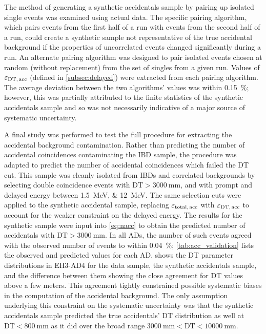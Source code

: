 The method of generating a synthetic accidentals sample
by pairing up isolated single events was examined using actual data.
The specific pairing algorithm, which pairs events from the first half of a run
with events from the second half of a run,
could create a synthetic sample not representative of the true accidental background
if the properties of uncorrelated events changed significantly during a run.
An alternate pairing algorithm was designed to pair isolated events
chosen at random (without replacement) from the set of singles from a given run.
Values of $\varepsilon_{\text{DT,\,acc}}$ (defined in \cref{subsec:delayed}) were extracted from each pairing algorithm.
The average deviation between the two algorithms' values was within \SI{0.15}{\percent};
however, this was partially attributed to the finite statistics
of the synthetic accidentals sample
and so was not necessarily indicative of a major source of systematic uncertainty.

A final study was performed to test the full procedure
for extracting the accidental background contamination.
Rather than predicting the number of accidental coincidences
contaminating the IBD sample,
the procedure was adapted to predict the number of accidental coincidences
which failed the DT cut.
This sample was cleanly isolated from IBDs and correlated backgrounds
by selecting double coincidence events with $\text{DT} > \SI{3000}{\mm}$,
and with prompt and delayed energy between \SIlist{1.5;12}{\MeV}.
The same selection cuts were applied to the synthetic accidental sample,
replacing $\varepsilon_\text{total,\,acc}$ with $\varepsilon_\text{DT,\,acc}$
to account for the weaker constraint on the delayed energy.
The results for the synthetic sample were input into \cref{eq:nacc} to obtain
the predicted number of accidentals with $\text{DT} > \SI{3000}{\mm}$.
In all ADs, the number of such events
agreed with the observed number of events
to within \SI{0.04}{\percent};
\cref{tab:acc_validation} lists the observed and predicted values
for each AD.
 shows the DT parameter distributions in EH3-AD4
for the data sample, the synthetic accidentals sample,
and the difference between them
showing the close agreement for DT values above a few meters.
This agreement tightly constrained possible systematic biases
in the computation of the accidental background.
The only assumption underlying this constraint on the systematic uncertainty
was that the synthetic accidentals sample
predicted the true accidentals' DT distribution as well at $\text{DT} < \SI{800}{\mm}$
as it did over the broad range $\SI{3000}{\mm} < \text{DT} < \SI{10000}{\mm}$.

